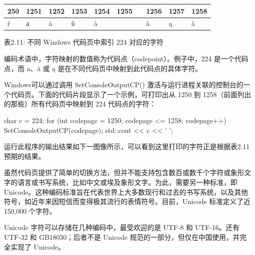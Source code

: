 \begin{longtable}{|l|l|l|l|l|l|l|l|l|}
\hline
\textbf{250} & \textbf{1251} & \textbf{1252} & \textbf{1253} & \textbf{1254} & \textbf{1255} & \textbf{1256} & \textbf{1257} & \textbf{1258} \\ \hline
\endfirsthead
%
\endhead
%
ŕ            & а             & à             & ΰ             & à             & \includegraphics[width=0.018\textwidth]{content/chapter2/images/table-1.png}            & à             & ą             & à             \\ \hline
\end{longtable}

\begin{center}
表2.11: 不同 Windows 代码页中索引 224 对应的字符
\end{center}

\begin{myNotic}
编码术语中，字符映射的数值称为代码点（codepoint）。例子中，224 是一个代码点，而 a、à 或 ą 是在不同代码页中映射到此代码点的具体字符。
\end{myNotic}

 Windows可以通过调用 SetConsoleOutputCP() 激活与运行进程关联的控制台的一个代码页。下面的代码片段显示了一个示例，可打印出从 1250 到 1258（前面列出的那些）所有代码页中映射到 224 代码点的字符：

\begin{cpp}
char c = 224;
for (int codepage = 1250; codepage <= 1258; codepage++)
{
    SetConsoleOutputCP(codepage);
    std::cout << c << ' ';
}
\end{cpp}

运行此程序的输出结果如下一图像所示，可以看到这里打印的字符正是根据表2.11预期的结果。


虽然代码页提供了简单的切换方法，但并不能支持包含数百或数千个字符或象形文字的语言或书写系统，比如中文或埃及象形文字。为此，需要另一种标准，即 Unicode。这种编码标准旨在代表世界上大多数现行和过去的书写系统，以及其他符号，如近年来因短信而变得极其流行的表情符号。目前，Unicode 标准定义了近 150,000 个字符。

Unicode 字符可以存储在几种编码中，最受欢迎的是 UTF-8 和 UTF-16。还有 UTF-32 和 GB18030；后者不是 Unicode 规范的一部分，但仅在中国使用，并完全实现了 Unicode。

